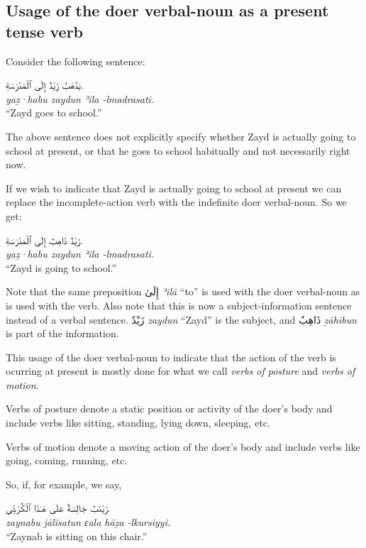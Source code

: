 \documentclass[
  10pt,
]{book}
\begin{document}
\subsection{Usage of the doer verbal-noun as a present tense verb}\label{usage-of-the-doer-verbal-noun-as-a-present-tense-verb}

Consider the following sentence:

\foreignlanguage{arabic}{يَذْهَبُ زَيْدٌ إِلَى ٱلْمَدْرَسَةِ.}\\
\emph{yaẕ·habu zaydun ʾila -lmadrasati.}\\
\enquote{Zayd goes to school.}

The above sentence does not explicitly specify whether Zayd is actually going to school at present, or that he goes to school habitually and not necessarily right now.

If we wish to indicate that Zayd is actually going to school at present we can replace the incomplete-action verb with the indefinite doer verbal-noun. So we get:

\foreignlanguage{arabic}{زَيْدٌ ذَاهِبٌ إِلَى ٱلْمَدْرَسَةِ.}\\
\emph{yaẕ·habu zaydun ʾila -lmadrasati.}\\
\enquote{Zayd is going to school.}

Note that the same preposition \foreignlanguage{arabic}{إِلَىٰ} \emph{ʾilā} \enquote{to} is used with the doer verbal-noun as is used with the verb.
Also note that this is now a subject-information sentence instead of a verbal sentence. \foreignlanguage{arabic}{زَيْدٌ} \emph{zaydun} \enquote{Zayd} is the subject, and \foreignlanguage{arabic}{ذَاهِبٌ} \emph{ẕāhibun} is part of the information.

This usage of the doer verbal-noun to indicate that the action of the verb is ocurring at present is mostly done for what we call \emph{verbs of posture} and \emph{verbs of motion}.

Verbs of posture denote a static position or activity of the doer's body and include verbs like sitting, standing, lying down, sleeping, etc.

Verbs of motion denote a moving action of the doer's body and include verbs like
going, coming, running, etc.

So, if, for example, we say,

\foreignlanguage{arabic}{زَيْنَبُ جَالِسَةٌ عَلَى هَـٰذَا ٱلْکُرْسِيِّ.}\\
\emph{zaynabu jālisatun ɛala hāẕa -lkursiyyi.}\\
\enquote{Zaynab is sitting on this chair.}
\end{document}
